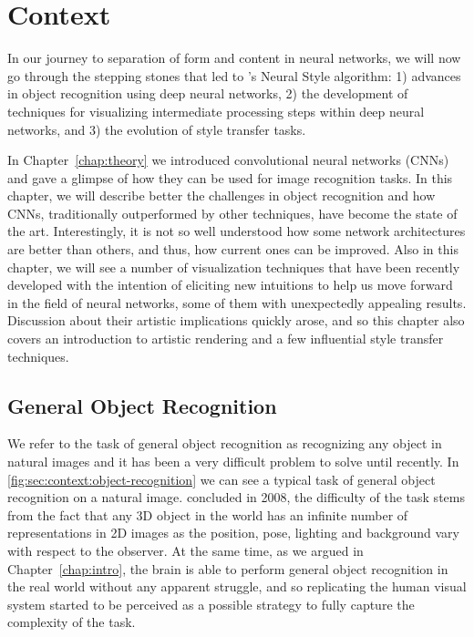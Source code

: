 
\chapter{Context}
\label{chap:context}




In our journey to separation of form and content in neural networks, we will now go through the stepping stones that led to \citeauthor{Gatys2015B}'s Neural Style algorithm: 1) advances in object recognition using deep neural networks, 2) the development of techniques for visualizing intermediate processing steps within deep neural networks, and 3) the evolution of style transfer tasks.

In Chapter~\ref{chap:theory} we introduced convolutional neural networks (CNNs) and gave a glimpse of how they can be used for image recognition tasks.
In this chapter, we will describe better the challenges in object recognition and how CNNs, traditionally outperformed by other techniques, have become the state of the art.
Interestingly, it is not so well understood how some network architectures are better than others, and thus, how current ones can be improved.
Also in this chapter, we will see a number of visualization techniques that have been recently developed with the intention of eliciting new intuitions to help us move forward in the field of neural networks, some of them with unexpectedly appealing results.
Discussion about their artistic implications quickly arose, and so this chapter also covers an introduction to artistic rendering and a few influential style transfer techniques.



\section{General Object Recognition}
\label{sec:context:general-object-recognition}

We refer to the task of general object recognition as recognizing any object in natural images and it has been a very difficult problem to solve until recently.
In \autoref{fig:sec:context:object-recognition} we can see a typical task of general object recognition on a natural image.
\citet{Pinto2008} concluded in 2008, the difficulty of the task stems from the fact that any 3D object in the world has an infinite number of representations in 2D images as the position, pose, lighting and background vary with respect to the observer.
At the same time, as we argued in Chapter~\ref{chap:intro}, the brain is able to perform general object recognition in the real world without any apparent struggle, and so replicating the human visual system started to be perceived as a possible strategy to fully capture the complexity of the task.

